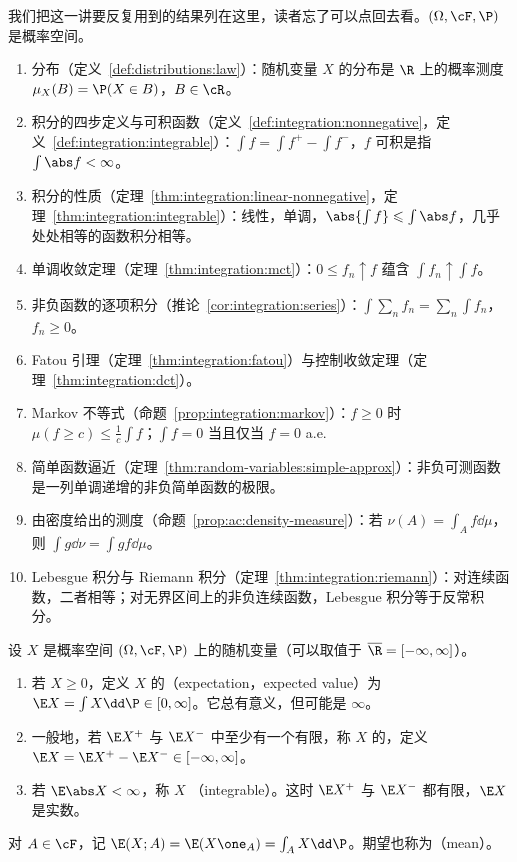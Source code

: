 我们把这一讲要反复用到的结果列在这里，读者忘了可以点回去看。$(\Omega,\cF,\P)$ 是概率空间。
\begin{enumerate}
\item 分布（定义~\ref{def:distributions:law}）：随机变量 $X$ 的分布是 $\R$ 上的概率测度 $\mu_X(B)=\P(X\in B)$，$B\in\cR$。
\item 积分的四步定义与可积函数（定义~\ref{def:integration:nonnegative}，定义~\ref{def:integration:integrable}）：$\int f=\int f^+-\int f^-$，$f$ 可积是指 $\int\abs f<\infty$。
\item 积分的性质（定理~\ref{thm:integration:linear-nonnegative}，定理~\ref{thm:integration:integrable}）：线性，单调，$\abs{\int f}\leqslant\int\abs f$，几乎处处相等的函数积分相等。
\item 单调收敛定理（定理~\ref{thm:integration:mct}）：$0\leqslant f_n\uparrow f$ 蕴含 $\int f_n\uparrow\int f$。
\item 非负函数的逐项积分（推论~\ref{cor:integration:series}）：$\int\sum_nf_n=\sum_n\int f_n$，$f_n\geqslant0$。
\item Fatou 引理（定理~\ref{thm:integration:fatou}）与控制收敛定理（定理~\ref{thm:integration:dct}）。
\item Markov 不等式（命题~\ref{prop:integration:markov}）：$f\geqslant0$ 时 $\mu(f\geqslant c)\leqslant\frac1c\int f$；$\int f=0$ 当且仅当 $f=0$ a.e.
\item 简单函数逼近（定理~\ref{thm:random-variables:simple-approx}）：非负可测函数是一列单调递增的非负简单函数的极限。
\item 由密度给出的测度（命题~\ref{prop:ac:density-measure}）：若 $\nu(A)=\int_Af\dd\mu$，则 $\int g\dd\nu=\int gf\dd\mu$。
\item Lebesgue 积分与 Riemann 积分（定理~\ref{thm:integration:riemann}）：对连续函数，二者相等；对无界区间上的非负连续函数，Lebesgue 积分等于反常积分。
\end{enumerate}


\begin{definition}[期望]\label{def:expectation:expectation}
设 $X$ 是概率空间 $(\Omega,\cF,\P)$ 上的随机变量（可以取值于 $\overline\R=[-\infty,\infty]$）。
\begin{enumerate}
\item 若 $X\geqslant0$，定义 $X$ 的（expectation，expected value）为 $\E X=\int X\dd \P\in[0,\infty]$。它总有意义，但可能是 $\infty$。
\item 一般地，若 $\E X^+$ 与 $\E X^-$ 中至少有一个有限，称 $X$ 的，定义 $\E X=\E X^+-\E X^-\in[-\infty,\infty]$。
\item 若 $\E\abs X<\infty$，称 $X$ （integrable）。这时 $\E X^+$ 与 $\E X^-$ 都有限，$\E X$ 是实数。
\end{enumerate}
对 $A\in\cF$，记 $\E(X;A)=\E(X\one_A)=\int_AX\dd \P$。期望也称为（mean）。
\end{definition}

